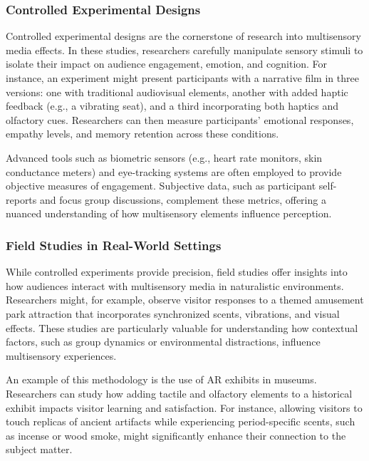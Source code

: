 \documentclass[
]{book}
\begin{document}
\subsubsection{Controlled Experimental Designs}\label{controlled-experimental-designs}

Controlled experimental designs are the cornerstone of research into multisensory media effects. In these studies, researchers carefully manipulate sensory stimuli to isolate their impact on audience engagement, emotion, and cognition. For instance, an experiment might present participants with a narrative film in three versions: one with traditional audiovisual elements, another with added haptic feedback (e.g., a vibrating seat), and a third incorporating both haptics and olfactory cues. Researchers can then measure participants' emotional responses, empathy levels, and memory retention across these conditions.

Advanced tools such as biometric sensors (e.g., heart rate monitors, skin conductance meters) and eye-tracking systems are often employed to provide objective measures of engagement. Subjective data, such as participant self-reports and focus group discussions, complement these metrics, offering a nuanced understanding of how multisensory elements influence perception.

\subsubsection{Field Studies in Real-World Settings}\label{field-studies-in-real-world-settings}

While controlled experiments provide precision, field studies offer insights into how audiences interact with multisensory media in naturalistic environments. Researchers might, for example, observe visitor responses to a themed amusement park attraction that incorporates synchronized scents, vibrations, and visual effects. These studies are particularly valuable for understanding how contextual factors, such as group dynamics or environmental distractions, influence multisensory experiences.

An example of this methodology is the use of AR exhibits in museums. Researchers can study how adding tactile and olfactory elements to a historical exhibit impacts visitor learning and satisfaction. For instance, allowing visitors to touch replicas of ancient artifacts while experiencing period-specific scents, such as incense or wood smoke, might significantly enhance their connection to the subject matter.
\end{document}
